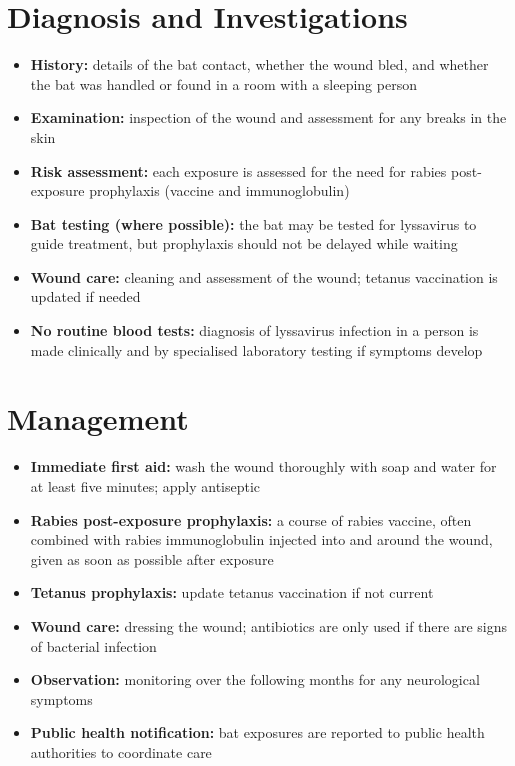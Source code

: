 \section*{Diagnosis and Investigations}
\begin{itemize}
    \item \textbf{History:} details of the bat contact, whether the wound bled, and whether the bat was handled or found in a room with a sleeping person
    \item \textbf{Examination:} inspection of the wound and assessment for any breaks in the skin
    \item \textbf{Risk assessment:} each exposure is assessed for the need for rabies post-exposure prophylaxis (vaccine and immunoglobulin)
    \item \textbf{Bat testing (where possible):} the bat may be tested for lyssavirus to guide treatment, but prophylaxis should not be delayed while waiting
    \item \textbf{Wound care:} cleaning and assessment of the wound; tetanus vaccination is updated if needed
    \item \textbf{No routine blood tests:} diagnosis of lyssavirus infection in a person is made clinically and by specialised laboratory testing if symptoms develop
\end{itemize}

\section*{Management}
\begin{itemize}
    \item \textbf{Immediate first aid:} wash the wound thoroughly with soap and water for at least five minutes; apply antiseptic
    \item \textbf{Rabies post-exposure prophylaxis:} a course of rabies vaccine, often combined with rabies immunoglobulin injected into and around the wound, given as soon as possible after exposure
    \item \textbf{Tetanus prophylaxis:} update tetanus vaccination if not current
    \item \textbf{Wound care:} dressing the wound; antibiotics are only used if there are signs of bacterial infection
    \item \textbf{Observation:} monitoring over the following months for any neurological symptoms
    \item \textbf{Public health notification:} bat exposures are reported to public health authorities to coordinate care
\end{itemize}

